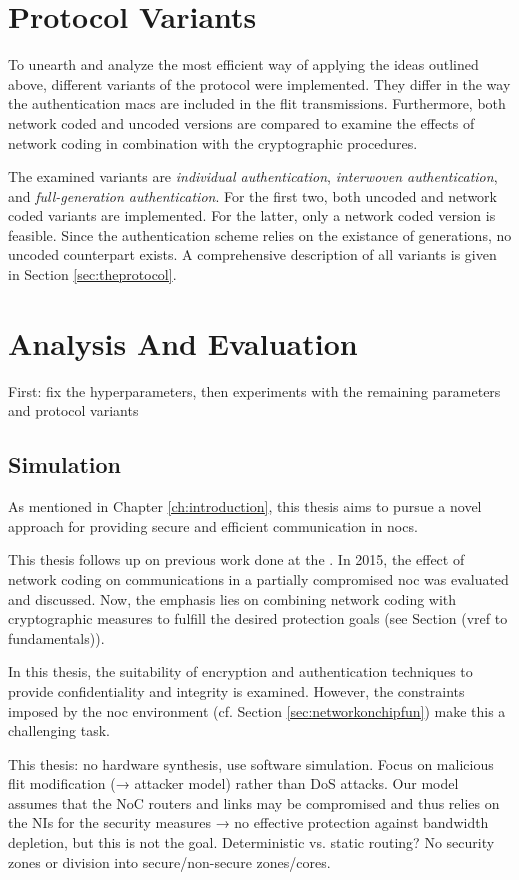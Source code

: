 \section{Protocol Variants}\label{sec:protocolvariants}
To unearth and analyze the most efficient way of applying the ideas outlined above, different variants of the protocol were implemented. They differ
in the way the authentication \glspl{mac} are included in the flit transmissions. Furthermore, both network coded and uncoded versions are compared to
examine the effects of network coding in combination with the cryptographic procedures.

The examined variants are \textit{individual authentication}, \textit{interwoven authentication}, and \textit{full-generation authentication}. For the
first two, both uncoded and network coded variants are implemented. For the latter, only a network coded version is feasible. Since the authentication
scheme relies on the existance of generations, no uncoded counterpart exists. A comprehensive description of all variants is given in Section
\ref{sec:theprotocol}. %

\section{Analysis And Evaluation}
First: fix the hyperparameters, then experiments with the remaining parameters and protocol variants
\subsection{Simulation}



As mentioned in Chapter \ref{ch:introduction}, this thesis aims to pursue a novel approach for providing secure and efficient communication in
\glspl{noc}.

This thesis follows up on previous work done at the \thechair. In 2015, the effect of network coding
on communications in a partially compromised \gls{noc} was evaluated and discussed. Now, the emphasis lies on combining network coding with
cryptographic measures to fulfill the desired protection goals (see Section (vref to fundamentals)). %

In this thesis, the suitability of encryption and authentication techniques to provide confidentiality and integrity is examined. However, the
constraints imposed by the \gls{noc} environment (cf. Section \ref{sec:networkonchipfun}) make this a challenging task.

This thesis: no hardware synthesis, use software simulation. Focus on malicious flit modification (→ attacker model) rather than DoS attacks. Our
model assumes that the NoC routers and links may be compromised and thus relies on the NIs for the security measures → no effective protection
against bandwidth depletion, but this is not the goal.
Deterministic vs. static routing? No security zones or division into secure/non-secure zones/cores.
